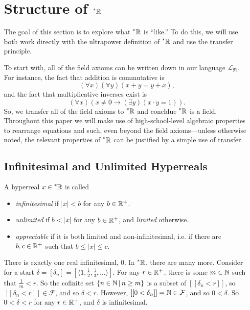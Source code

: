 \section{Structure of \texorpdfstring{$\prescript{*}{}{\mathbb{R}}$}{*R}}
The goal of this section is to explore what $\prescript{*}{}{\mathbb{R}}$ is ``like.'' To do this, we will use both work directly with the ultrapower definition of $\prescript{*}{}{\mathbb{R}}$ and use the transfer principle.

To start with, all of the field axioms can be written down in our language $\mathcal{L}_\mathfrak{R}$. For instance, the fact that addition is commutative is
\[ (\forall x)(\forall y)(x + y = y + x), \]
and the fact that multiplicative inverses exist is 
\[ (\forall x)(x \neq 0 \to (\exists y)(x \cdot y = 1)). \]
So, we transfer all of the field axioms to $\prescript{*}{}{\mathbb{R}}$ and concldue $\prescript{*}{}{\mathbb{R}}$ is a field. Throughout this paper we will make use of high-school-level algebraic properties to rearrange equations and such, even beyond the field axioms---unless otherwise noted, the relevant properties of $\prescript{*}{}{\mathbb{R}}$ can be justified by a simple use of transfer.

\subsection{Infinitesimal and Unlimited Hyperreals}

\begin{defn}
    A hyperreal $x \in \prescript{*}{}{\mathbb{R}}$ is called
    \begin{itemize}
        \item \textit{infinitesimal} if $|x| < b$ for any $b \in \mathbb{R}^+$.
        \item \textit{unlimited} if $b < |x|$ for any $b \in \mathbb{R}^+$, and \textit{limited} otherwise.
        \item \textit{appreciable} if it is both limited and non-infinitesimal, i.e. if there are $b, c \in \mathbb{R}^+$ such that $b \leq |x| \leq c$.
    \end{itemize}
\end{defn}

There is exactly one real infinitesimal, $0$. In $\prescript{*}{}{\mathbb{R}}$, there are many more. Consider for a start $\delta = [\delta_n] = [\langle 1, \frac{1}{2}, \frac{1}{3}, \ldots \rangle]$. For any $r \in \mathbb{R}^+$, there is some $m \in \mathbb{N}$ such that $\frac{1}{m} < r$. So the cofinite set $\{n \in \mathbb{N} \,|\, n \geq m\}$ is a subset of $[[\delta_n < r]]$, so $[[\delta_n < r]] \in \mathcal{F}$, and so $\delta < r$. However, $[[0 < \delta_n]] = \mathbb{N} \in \mathcal{F}$, and so $0 < \delta$. So $0 < \delta < r$ for any $r \in \mathbb{R}^+$, and $\delta$ is infinitesimal.

